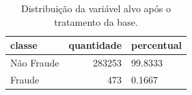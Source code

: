 \begin{table}
\caption{Distribuição da variável alvo após o tratamento da base.}
\label{tab:distribuicao-target}
\begin{tabular}{lrl}
\toprule
classe & quantidade & percentual \\
\midrule
Não Fraude & 283253 & 99.8333 \\
Fraude & 473 & 0.1667 \\
\bottomrule
\end{tabular}
\end{table}
